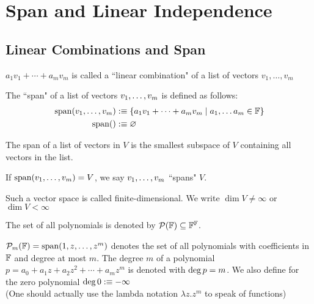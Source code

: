 \section{Span and Linear Independence}
\subsection{Linear Combinations and Span}

\setcounter{thm}{1}
\begin{mydef}
  $a_1 v_1 + \cdots + a_m v_m$ is called a ``linear combination" of a list of vectors $v_1, \dots, v_m$
\end{mydef}

\setcounter{thm}{3}
\begin{mydef} The ``span" of a list of vectors $v_1, \dots, v_m$ is defined as follows:
  \begin{equation}
    \begin{aligned}
      \operatorname{span} (v_1, \dots, v_m) &:\equiv \{a_1 v_1 + \cdots + a_m v_m \mid a_1, \dots a_m \in \mathbb{F} \}\\
      \operatorname{span} ( ) &:\equiv \varnothing
    \end{aligned}
  \end{equation}
\end{mydef}

\setcounter{thm}{5}
\begin{thm}
  The  span of a list of vectors in $V$ is the smallest subspace of $V$ containing all vectors in the list.
\end{thm}

\begin{mydef}
  If $\operatorname{span} (v_1, \dots, v_m) = V$, we say $v_1, \dots, v_m$ ``spans" $V$.
\end{mydef}

\setcounter{thm}{8}
\begin{mydef}
  Such a vector space is called finite-dimensional. We write $\dim V \neq \infty$ or $\dim V < \infty$
\end{mydef}

\begin{mydef}
  The set of all polynomials is denoted by $\mathcal{P} (\mathbb{F}) \subseteq \mathbb{F}^{\mathbb{F}}$.
\end{mydef}
\begin{mydef}
  $\mathcal{P}_m (\mathbb{F} )=\operatorname{span} (1,z,\dots,z^m)$ denotes the set of all polynomials with coefficients in $\mathbb{F}$ and degree at most $m$. The degree $m$ of a polynomial $p=a_0+a_1z+a_2z^2+\cdots+a_mz^m$ is denoted with ${\operatorname{deg} \,} p=m$.
  We also define for the zero polynomial ${\operatorname{deg} \,} 0 : \equiv -\infty$ \\
  (One should actually use the lambda notation $\lambda z.z^m$ to speak of functions)
\end{mydef}

